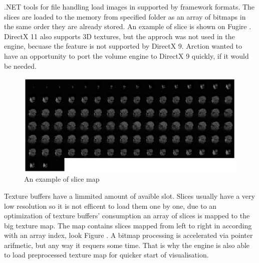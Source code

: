 \documentclass[twoside, english, 11pt]{report}
\begin{document}
.NET tools for file handling load images in supported by framework formats. The slices are loaded to the memory from specified folder as an array of bitmaps in the same order they are already stored. An example of slice is shown on Fugire \label{fig:slice}. DirectX 11 also supports 3D textures, but the approch was not used in the engine, becuase the feature is not supported by DirectX 9. Arction wanted to have an opportunity to port the volume engine to DirectX 9 quickly, if it would be needed. \\

\begin{figure}[!h]
\centerline{\includegraphics[scale = 0.35]{img/map}}
\caption{An example of slice map\label{fig:map}}
\end{figure}
Texture buffers have a limmited amount of avaible slot. Slices usually have a very low resolution so it is not efficent to load them one by one, due to an optimization of texture buffers' consumption an array of slices is mapped to the big texture map. The map contains slices mapped from left to right in according with an array index, look Figure \label{fig:map}. A bitmap processing is accelerated via pointer arifmetic, but any way it requers some time. That is why the engine is also able to load preprocessed texture map for quicker start of visualisation. \\
\end{document}
